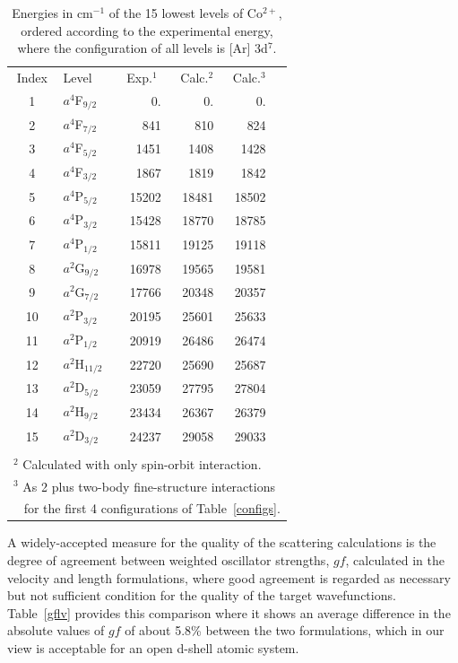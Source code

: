 \documentclass[useAMS,usenatbib]{mn2e}
\begin{document}
\begin{table}
\caption{Energies in cm$^{-1}$ of the 15 lowest levels of Co$^{2+}$, ordered according to the
experimental energy, where the configuration of all levels is [Ar] 3d$^7$.}
 \centering
\begin{tabular}{clrrrr}
\noalign{\hrule}
 Index & Level &
\multicolumn{1}{c}{Exp.$^{1}$} & Calc.$^2$ &  Calc.$^3$ \\
\noalign{\hrule}
%
       1  & $a^4$F$_{9/2}$     & 0.     & 0.    & 0. \\
       2  & $a^4$F$_{7/2}$     & 841    & 810   & 824 \\
       3  & $a^4$F$_{5/2}$     & 1451   & 1408  & 1428 \\
       4  & $a^4$F$_{3/2}$     & 1867   & 1819  & 1842 \\
       5  & $a^4$P$_{5/2}$     & 15202  & 18481 & 18502 \\
       6  & $a^4$P$_{3/2}$     & 15428  & 18770 & 18785 \\
       7  & $a^4$P$_{1/2}$     & 15811  & 19125 & 19118 \\
       8  & $a^2$G$_{9/2}$     & 16978  & 19565 & 19581 \\
       9  & $a^2$G$_{7/2}$     & 17766  & 20348 & 20357 \\
       10 & $a^2$P$_{3/2}$     & 20195  & 25601 & 25633 \\
       11 & $a^2$P$_{1/2}$     & 20919  & 26486 & 26474 \\
       12 & $a^2$H$_{11/2}$    & 22720  & 25690 & 25687 \\
       13 & $a^2$D$_{5/2}$     & 23059  & 27795 & 27804 \\
       14 & $a^2$H$_{9/2}$     & 23434  & 26367 & 26379 \\
       15 & $a^2$D$_{3/2}$     & 24237  & 29058 & 29033 \\
\noalign{\hrule}
\multicolumn{6}{l}{$^{1}$ \citealt{SugarC1985}.} \\
\multicolumn{6}{l}{$^2$ Calculated with only spin-orbit interaction.} \\
\multicolumn{6}{l}{$^3$ As 2 plus two-body fine-structure interactions} \\
\multicolumn{6}{l}{\,\,\,     for the first 4 configurations of Table~\ref{configs}.} \\
\end{tabular}
\label{levellist}
\end{table}

A widely-accepted measure for the quality of the scattering calculations is the degree of agreement
between weighted oscillator strengths, $gf$, calculated in the velocity and length formulations,
where good agreement is regarded as necessary but not sufficient condition for the quality of the
target wavefunctions. Table~\ref{gflv} provides this comparison where it shows an average
difference in the absolute values of $gf$ of about 5.8\% between the two formulations, which in our
view is acceptable for an open d-shell atomic system.
\end{document}
